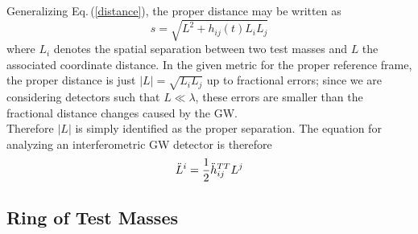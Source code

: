 \documentclass[binding=0.6cm, LaM]{sapthesis}
\begin{document}
        Generalizing Eq.\,(\ref{distance}), the proper distance may be written as
                \begin{equation}
                	s = \sqrt{L^2 + h_{ij}(t)L_{i}L_{j}}
                \end{equation}
        where $L_i$ denotes the spatial separation between two test masses and $L$ the associated coordinate distance.
        In the given metric for the proper reference frame, the proper distance is just $|L| = \sqrt{L_iL_j}$ up to fractional errors;
        since we are considering detectors such that
        $L \ll \lambda$, these errors are smaller than the fractional distance changes caused by the GW. \\
        Therefore $|L|$ is simply identified as the proper separation. The equation for analyzing an interferometric GW detector is therefore
                \begin{equation}
                	{\ddot L}^i = {1 \over 2}{\ddot h}_{ij}^{TT}L^j
                \end{equation}

\subsection{Ring of Test Masses}
\end{document}
